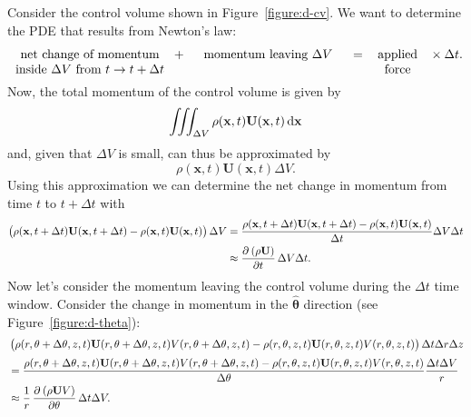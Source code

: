 \documentclass{article}
\def\*#1{\mathbf{#1}}
\newcommand{\thetahat}{\boldsymbol{\hat{\theta}}}
\begin{document}
Consider the control volume shown in Figure~\ref{figure:d-cv}. We want
to determine the PDE that results from Newton's law:
%
\begin{equation*}
    \parbox[t]{13em}{\centering
        net change of momentum inside $\Delta V$ from $t \to t + \Delta t$
    }
    +
    \parbox[t]{13em}{\centering
        momentum leaving $\Delta V$
    }
    =
    \parbox[t]{5em}{\centering
        applied force
    }
    \times
    \Delta t
    .
\end{equation*}
%
Now, the total momentum of the control volume is given by
%
\begin{equation*}
    \iiint_{\Delta V} \rho(\*x, t) \*U(\*x, t) \dif \*x
\end{equation*}
%
and, given that $\Delta V$ is small, can thus be approximated by
%
\begin{equation*}
    \rho(\*x, t) \*U(\*x, t) \Delta V
    .
\end{equation*}
%
Using this approximation we can determine the net change in momentum
from time $t$ to $t + \Delta t$ with
%
\begin{align*}
    \del{
        \rho(\*x, t + \Delta t ) \*U(\*x, t + \Delta t )
        - \rho(\*x, t) \*U(\*x, t)
    } \Delta V
    &= \frac{
        \rho(\*x, t + \Delta t ) \*U(\*x, t + \Delta t )
        - \rho(\*x, t) \*U(\*x, t)
    }{\Delta t} \Delta V \Delta t \\
    &\approx \dpd{\del{\rho \*U}}{t} \Delta V \Delta t
    .
\end{align*}
%
Now let's consider the momentum leaving the control volume during the
$\Delta t$ time window. Consider the change in momentum in the
$\thetahat$ direction (see Figure~\ref{figure:d-theta}):
%
\begin{align*}
    &
    \del{
        \rho(r, \theta + \Delta \theta, z, t)
        \*U(r, \theta + \Delta \theta, z, t)
        V(r, \theta + \Delta \theta, z, t)
        - \rho(r, \theta, z, t)
        \*U(r, \theta, z, t)
        V(r, \theta, z, t)
    } \Delta t \Delta r \Delta z \\[0.5ex]
    &=
    \frac{
        \rho(r, \theta + \Delta \theta, z, t)
        \*U(r, \theta + \Delta \theta, z, t)
        V(r, \theta + \Delta \theta, z, t)
        - \rho(r, \theta, z, t)
        \*U(r, \theta, z, t)
        V(r, \theta, z, t)
    }{\Delta \theta}
    \frac{\Delta t \Delta V}{r} \\
    &\approx
    \frac{1}{r} \dpd{\del{\rho \*U V}}{\theta} \Delta t \Delta V
    .
\end{align*}
\end{document}
